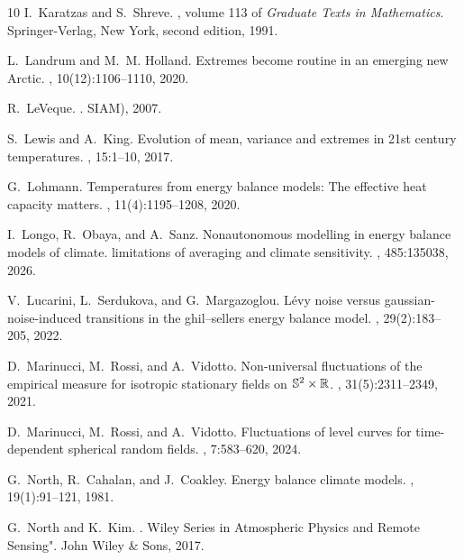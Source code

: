 \documentclass[10pt]{amsart}
\numberwithin{equation}{section}
\begin{document}
\begin{thebibliography}{10}
I.~Karatzas and S.~Shreve.
, volume 113 of {\em
  Graduate Texts in Mathematics}.
\newblock Springer-Verlag, New York, second edition, 1991.

L.~Landrum and M.~M. Holland.
\newblock Extremes become routine in an emerging new {A}rctic.
, 10(12):1106--1110, 2020.

R.~LeVeque.
.
\newblock SIAM), 2007.

S.~Lewis and A.~King.
\newblock Evolution of mean, variance and extremes in 21st century
  temperatures.
, 15:1--10, 2017.

G.~Lohmann.
\newblock Temperatures from energy balance models: The effective heat capacity
  matters.
, 11(4):1195--1208, 2020.

I.~Longo, R.~Obaya, and A.~Sanz.
\newblock Nonautonomous modelling in energy balance models of climate.
  limitations of averaging and climate sensitivity.
, 485:135038, 2026.

V.~Lucarini, L.~Serdukova, and G.~Margazoglou.
\newblock L{\'e}vy noise versus gaussian-noise-induced transitions in the
  ghil--sellers energy balance model.
, 29(2):183--205, 2022.

D.~Marinucci, M.~Rossi, and A.~Vidotto.
\newblock Non-universal fluctuations of the empirical measure for isotropic
  stationary fields on {$\Bbb S^2 \times \Bbb R$}.
, 31(5):2311--2349, 2021.

D.~Marinucci, M.~Rossi, and A.~Vidotto.
\newblock Fluctuations of level curves for time-dependent spherical random
  fields.
, 7:583--620, 2024.

G.~North, R.~Cahalan, and J.~Coakley.
\newblock Energy balance climate models.
, 19(1):91--121, 1981.

G.~North and K.~Kim.
.
\newblock Wiley Series in Atmospheric Physics and Remote Sensing". John Wiley
  \& Sons, 2017.


\end{thebibliography}
\end{document}
